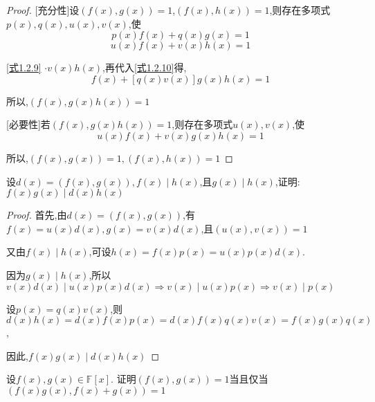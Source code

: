 \begin{proof}
    
    [充分性]设$(f(x),g(x))=1$,$(f(x),h(x))=1$,则存在多项式$p(x),q(x),u(x),v(x)$,使
    \begin{equation}
        p(x)f(x) + q(x)g(x) = 1 \label{式1.2.9}
    \end{equation}
    \begin{equation}
        u(x)f(x) + v(x)h(x) = 1 \label{式1.2.10}
    \end{equation}

    \cref{式1.2.9} $\cdot v(x)h(x)$,再代入\cref{式1.2.10}得,
    \begin{equation*}
        [p(x)v(x)h(x)+u(x)]f(x)+[q(x)v(x)]g(x)h(x) = 1
    \end{equation*}

    所以,$(f(x),g(x)h(x))=1$

    [必要性]若$(f(x),g(x)h(x))=1$,则存在多项式$u(x),v(x)$,使
    $$u(x)f(x)+v(x)g(x)h(x)=1$$

    所以,$(f(x),g(x))=1,(f(x),h(x))=1$
\end{proof}

\begin{example}
    设$d(x)=(f(x),g(x)),f(x)\mid h(x)$,且$g(x)\mid h(x)$,证明:$f(x)g(x)\mid d(x)h(x)$
\end{example}

\begin{proof}

    首先,由$d(x)=(f(x),g(x))$,有$f(x)=u(x)d(x),g(x)=v(x)d(x)$,且$(u(x),v(x))=1$

    又由$f(x)\mid h(x)$,可设$h(x)=f(x)p(x)=u(x)p(x)d(x)$. 
    
    因为$g(x)\mid h(x)$,所以$v(x)d(x)\mid u(x)p(x)d(x) \Longrightarrow v(x)\mid u(x)p(x) \Longrightarrow v(x)\mid p(x)$

    设$p(x)=q(x)v(x)$,则$d(x)h(x)=d(x)f(x)p(x)=d(x)f(x)q(x)v(x)=f(x)g(x)q(x)$,

    因此,$f(x)g(x)\mid d(x)h(x)$
\end{proof}

\begin{example}
    设$f(x),g(x)\in \mathbb{F}[x]$. 证明$(f(x),g(x))=1$当且仅当$(f(x)g(x),f(x)+g(x))=1$
\end{example}

